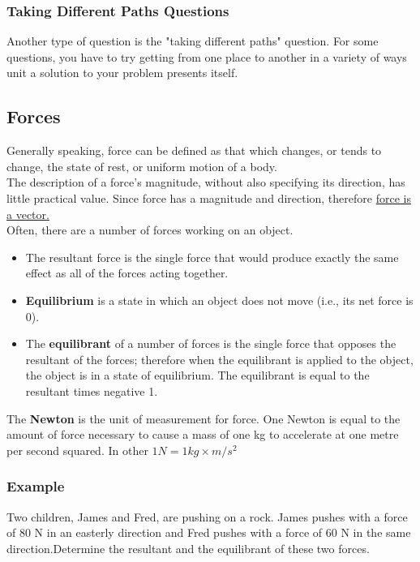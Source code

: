 \documentclass{article}
\begin{document}
\subsubsection{Taking Different Paths Questions }
Another type of question is the "taking different paths" question. For some questions, you have to try getting from one place to another in a variety of ways unit a solution to your problem presents itself.


\subsection{Forces}
Generally speaking, force can be defined as that which changes, or tends to change, the state of rest, or uniform motion of a body.\\
The description of a force's magnitude, without also specifying its direction, has little practical value. Since force has a magnitude and direction, therefore \underline{force is a vector.}\\

Often, there are a number of forces working on an object. 

\begin{itemize}
    \item The resultant force is the single force that would produce exactly the        same effect as all of the forces acting together.
    \item \textbf{Equilibrium} is a state in which an object does not move (i.e., its net force is 0).
    \item The \textbf{equilibrant} of a number of forces is the single force that opposes the resultant of the forces; therefore when the equilibrant is applied to the object, the object is in a state of equilibrium.  The equilibrant is equal to the resultant times negative 1.
\end{itemize}
The \textbf{Newton} is the unit of measurement for force.  One Newton is equal to the amount of force necessary to cause a mass of one kg to accelerate at one metre per second squared.  In other $1N=1kg \times m/s^2$

\subsubsection*{Example}
Two children, James and Fred, are pushing on a rock. James pushes with a force of 80 N in an easterly direction and Fred pushes with a force of 60 N in the same direction.Determine the resultant and the equilibrant of these two forces.
\end{document}
